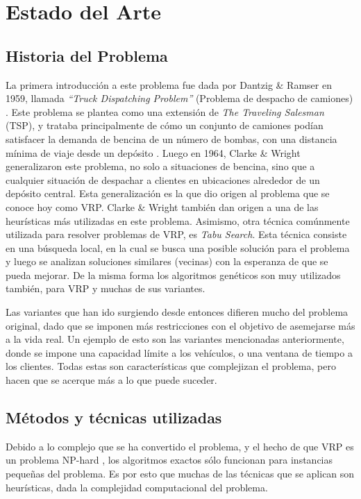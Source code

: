 \documentclass{article}
\begin{document}
\section{Estado del Arte}
\subsection{Historia del Problema}
La primera introducción a este problema fue dada por Dantzig \& Ramser en 1959, llamada \textit{``Truck Dispatching Problem''} (Problema de despacho de camiones) \cite{braekers2016vehicle}. Este problema se plantea como una extensión de \textit{The Traveling Salesman} (TSP), y trataba principalmente de cómo un conjunto de camiones podían satisfacer la demanda de bencina de un número de bombas, con una distancia mínima de viaje desde un depósito \cite{dantzig1959truck}. Luego en 1964, Clarke \& Wright generalizaron este problema, no solo a situaciones de bencina, sino que a cualquier situación de despachar a clientes en ubicaciones alrededor de un depósito central. Esta generalización es la que dio origen al problema que se conoce hoy como VRP. Clarke \& Wright también dan origen a una de las heurísticas más utilizadas en este problema.  Asimismo, otra técnica comúnmente utilizada para resolver problemas de VRP, es \textit{Tabu Search}\cite{braysy2004evolutionary}. Esta técnica consiste en una búsqueda local, en la cual se busca una posible solución para el problema y luego se analizan soluciones similares (vecinas) con la esperanza de que se pueda mejorar. De la misma forma los algoritmos genéticos son muy utilizados también, para VRP y muchas de sus variantes.

Las variantes que han ido surgiendo desde entonces difieren mucho del problema original, dado que se imponen más restricciones con el objetivo de asemejarse más a la vida real\cite{yan2012model}. Un ejemplo de esto son las variantes mencionadas anteriormente, donde se impone una capacidad límite a los vehículos, o una ventana de tiempo a los clientes. Todas estas son características que complejizan el problema, pero hacen que se acerque más a lo que puede suceder. 

\subsection{Métodos y técnicas utilizadas}
Debido a lo complejo que se ha convertido el problema, y el hecho de que VRP es un problema NP-hard \cite{lenstra1981complexity}, los algoritmos exactos sólo funcionan para instancias pequeñas del problema. Es por esto que muchas de las técnicas que se aplican son heurísticas, dada la complejidad computacional del problema.
\end{document}
